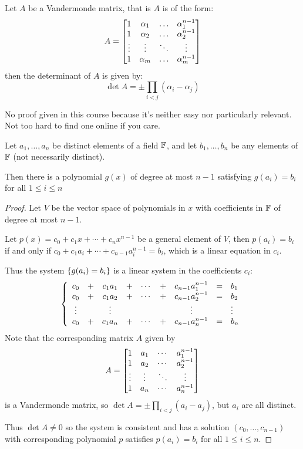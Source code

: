 \begin{lemma}
  Let $A$ be a Vandermonde matrix, that is $A$ is of the form:
    $$A = \begin{bmatrix}
      1 & \alpha_1 & \ldots & \alpha_1^{n-1} \\
      1 & \alpha_2 & \ldots & \alpha_2^{n-1} \\
      \vdots & \vdots & \ddots & \vdots \\ 
      1 & \alpha_m & \ldots & \alpha_m^{n-1}
    \end{bmatrix}$$
  then the determinant of $A$ is given by:
    $$\det A = \pm \prod_{i < j}(\alpha_i - \alpha_j)$$
\end{lemma}
No proof given in this course because it's neither easy nor particularly relevant. Not too hard to find one online if you care.

\begin{theorem}
  Let $a_1,\ldots,a_n$ be distinct elements of a field $\mathbb{F}$, and let $b_1,\ldots,b_n$ be any elements of $\mathbb{F}$ (not necessarily distinct).

  Then there is a polynomial $g(x)$ of degree at most $n-1$ satisfying $g(a_i) = b_i$ for all $1 \le i \le n$
\end{theorem}
\begin{proof}
  Let $V$ be the vector space of polynomials in $x$ with coefficients in $\mathbb{F}$ of degree at most $n-1$.

  Let $p(x) = c_0 + c_1x + \cdots + c_nx^{n-1}$ be a general element of $V$,
  then $p(a_i) = b_i$ if and only if $c_0 + c_1a_i + \cdots + c_{n-1}a_i^{n-1} = b_i$,
  which is a linear equation in $c_i$.

  Thus the system $\left\{ g(a_i) = b_i \right\}$ is a linear system in the coefficients $c_i$:
    $$\left\{
      \begin{array}{c c c c c c c c l}
        c_0 & + & c_1a_1 & + & \cdots & + & c_{n-1}a_1^{n-1} & = & b_1 \\
        c_0 & + & c_1a_2 & + & \cdots & + & c_{n-1}a_2^{n-1} & = & b_2 \\
        \vdots & & \vdots & & & & \vdots & & \vdots \\
        c_0 & + & c_1a_n & + & \cdots & + & c_{n-1}a_n^{n-1} & = & b_n
      \end{array}
      \right.$$
  Note that the corresponding matrix $A$ given by
    $$A = \begin{bmatrix}
      1 & a_1 & \cdots & a_1^{n-1} \\
      1 & a_2 & \cdots & a_2^{n-1} \\
      \vdots & \vdots & \ddots & \vdots \\
      1 & a_n & \cdots & a_n^{n-1}
    \end{bmatrix}$$
  is a Vandermonde matrix, so $\det A = \pm \prod\limits_{i < j}(a_i -a_j)$, but $a_i$ are all distinct.

  Thus $\det A \ne 0$ so the system is consistent and has a solution $(c_0, \ldots, c_{n-1})$
  with corresponding polynomial $p$ satisfies $p(a_i) = b_i$ for all $1 \le i \le n$.
\end{proof}

